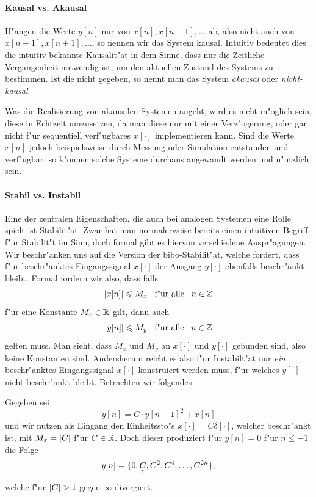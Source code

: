 \paragraph{Kausal vs. Akausal} 
H"angen die Werte $y[n]$ nur von $x[n], x[n-1], \dots$ ab, also nicht auch von $x[n+1], x[n+1], \dots$, so nennen wir das System kausal.
Intuitiv bedeutet dies die intuitiv bekannte Kausalit"at in dem Sinne, dass nur die Zeitliche Vergangenheit notwendig ist, um den aktuellen Zustand des Systems zu bestimmen.
Ist die nicht gegeben, so nennt man das System \emph{akausal} oder \emph{nicht-kausal}.

Was die Realisierung von akausalen Systemen angeht, wird es nicht m"oglich sein, diese in Echtzeit umzusetzen, da man diese nur mit einer Verz"ogerung, oder gar nicht f"ur sequentiell verf"ugbares $x[\cdot]$ implementieren kann.
Sind die Werte $x[n]$ jedoch beispielsweise durch Messung oder Simulation entstanden und  verf"ugbar, so k"onnen solche Systeme durchaus angewandt werden und n"utzlich sein.

\paragraph{Stabil vs. Instabil} Eine der zentralen Eigenschaften, die auch bei analogen Systemen eine Rolle spielt ist Stabilit"at.
Zwar hat man normalerweise bereits einen intuitiven Begriff f"ur Stabilit"t im Sinn, doch formal gibt es hiervon verschiedene Auspr"agungen.
Wir beschr"anken uns auf die Version der \gls{bibo}-Stabilit"at, welche fordert, dass f"ur beschr"anktes Eingangssignal $x[\cdot]$ der Ausgang $y[\cdot]$ ebenfalls beschr"ankt bleibt.
Formal fordern wir also, dass falls
\[
{\left| x[n] \right|} \leqslant M_x {\hspace{3mm} \text{f"ur alle} \hspace{3mm}} n \in \mathbb{Z}
\]
f"ur eine Konstante $M_x \in \mathbb{R}$ gilt, dann auch 
\[
{\left| y[n] \right|} \leqslant M_y {\hspace{3mm} \text{f"ur alle} \hspace{3mm}} n \in \mathbb{Z}
\]
gelten muss. 
Man sieht, dass $M_x$ und $M_y$ an $x[\cdot]$ und $y[\cdot]$ gebunden sind, also keine  Konstanten sind.
Andersherum reicht es also f"ur Instabilt"at nur \emph{ein} beschr"anktes Eingangssignal $x[\cdot]$ konstruiert werden muss, f"ur welches $y[\cdot]$ nicht beschr"ankt bleibt.
Betrachten wir folgendes
\begin{Bsp}
Gegeben sei
\[
y[n] = C \cdot y[n-1]^2 + x[n]
\]
und wir nutzen als Eingang den Einheitssto"s $x[\cdot] = C \delta[\cdot]$, welcher beschr"ankt ist, mit $M_x = {\left| C \right|}$ f"ur $C \in \mathbb{R}$.
Doch dieser produziert f"ur $y[n] = 0$ f"ur $n \leqslant -1$ die Folge
\[
y[n] = \{0, \underset{\uparrow}{C}, C^2, C^4, \dots, C^{2n}\},
\]
welche f"ur ${\left| C \right|} > 1$ gegen $\infty$ divergiert.
\end{Bsp}

